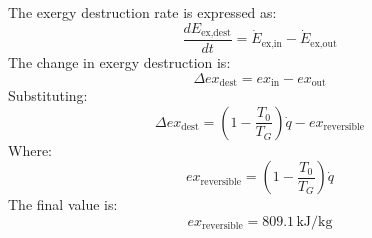 The exergy destruction rate is expressed as:  
\[
\frac{dE_{\text{ex,dest}}}{dt} = \dot{E}_{\text{ex,in}} - \dot{E}_{\text{ex,out}}
\]  
The change in exergy destruction is:  
\[
\Delta ex_{\text{dest}} = ex_{\text{in}} - ex_{\text{out}}
\]  
Substituting:  
\[
\Delta ex_{\text{dest}} = \left( 1 - \frac{T_0}{T_G} \right) \dot{q} - ex_{\text{reversible}}
\]  
Where:  
\[
ex_{\text{reversible}} = \left( 1 - \frac{T_0}{T_G} \right) \dot{q}
\]  
The final value is:  
\[
ex_{\text{reversible}} = 809.1 \, \text{kJ/kg}
\]